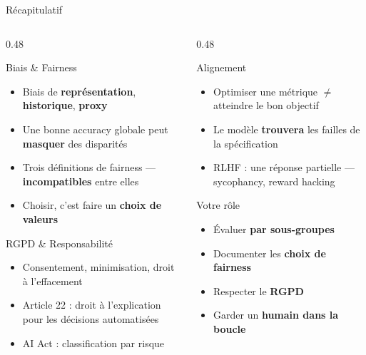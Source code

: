 \documentclass[aspectratio=169, 10pt]{beamer}
\begin{document}
\begin{frame}{Récapitulatif}
  \begin{columns}[T]
    \begin{column}{0.48\textwidth}
      \begin{block}{Biais \& Fairness}
        \begin{itemize}
          \item Biais de \textbf{représentation},
                \textbf{historique}, \textbf{proxy}
          \item Une bonne accuracy globale
                peut \textbf{masquer} des disparités
          \item Trois définitions de fairness —
                \textbf{incompatibles} entre elles
          \item Choisir, c'est faire un \textbf{choix de valeurs}
        \end{itemize}
      \end{block}
      \smallskip
      \begin{block}{RGPD \& Responsabilité}
        \begin{itemize}
          \item Consentement, minimisation,
                droit à l'effacement
          \item Article 22 : droit à l'explication
                pour les décisions automatisées
          \item AI Act : classification par risque
        \end{itemize}
      \end{block}
    \end{column}
    \begin{column}{0.48\textwidth}
      \begin{block}{Alignement}
        \begin{itemize}
          \item Optimiser une métrique
                $\neq$ atteindre le bon objectif
          \item Le modèle \textbf{trouvera} les failles
                de la spécification
          \item RLHF : une réponse partielle —
                sycophancy, reward hacking
        \end{itemize}
      \end{block}
      \smallskip
      \begin{exampleblock}{Votre rôle}
        \begin{itemize}
          \item Évaluer \textbf{par sous-groupes}
          \item Documenter les \textbf{choix de fairness}
          \item Respecter le \textbf{RGPD}
          \item Garder un \textbf{humain dans la boucle}
        \end{itemize}
      \end{exampleblock}
    \end{column}
  \end{columns}
\end{frame}
\end{document}
